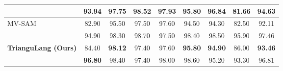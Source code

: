 \begin{table}[!h]
{\begin{tabular}{lcccccccc}
 & 93.94 & 97.75 & 98.52 & 97.93 & 95.80 & 96.84 & 81.66 & 94.63 \\
\midrule
\multirow{2}{*}{MV-SAM}
 & 82.90 & 95.50 & 97.50 & 97.60 & 94.50 & 94.30 & 82.50 & 92.11 \\
 & 94.90 & 98.30 & 98.70 & 97.50 & 98.40 & 98.50 & 95.90 & 97.46 \\
\midrule
\multirow{2}{*}{\textbf{TrianguLang (Ours)}}
 & 84.40 & \textbf{98.12} & 97.40 & 97.60 & \textbf{95.80} & \textbf{94.90} & 86.00 & \textbf{93.46} \\
 & \textbf{96.80} & 98.40 & 97.40 & 98.00 & 98.60 & 95.20 & 93.30 & 96.81 \\
\bottomrule
\end{tabular}
}
\end{table}

